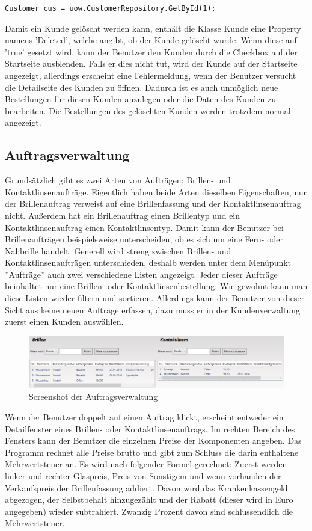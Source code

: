 \begin{lstlisting}
Customer cus = uow.CustomerRepository.GetById(1);
\end{lstlisting}
Damit ein Kunde gelöscht werden kann, enthält die Klasse Kunde eine Property namens 'Deleted', welche angibt, ob der Kunde gelöscht wurde. Wenn diese auf 'true' gesetzt wird, kann der Benutzer den Kunden durch die Checkbox auf der Startseite ausblenden. Falls er dies nicht tut, wird der Kunde auf der Startseite angezeigt, allerdings erscheint eine Fehlermeldung, wenn der Benutzer versucht die Detailseite des Kunden zu öffnen. Dadurch ist es auch unmöglich neue Bestellungen für diesen Kunden anzulegen oder die Daten des Kunden zu bearbeiten. Die Bestellungen des gelöschten Kunden werden trotzdem normal angezeigt.
\subsection{Auftragsverwaltung}
Grundsätzlich gibt es zwei Arten von Aufträgen: Brillen- und Kontaktlinsenaufträge. Eigentlich haben beide Arten dieselben Eigenschaften, nur der Brillenauftrag verweist auf eine Brillenfassung und der Kontaktlinsenauftrag nicht. Außerdem hat ein Brillenauftrag einen Brillentyp und ein Kontaktlinsenauftrag einen Kontaktlinsentyp. Damit kann der Benutzer bei Brillenaufträgen beispielsweise unterscheiden, ob es sich um eine Fern- oder Nahbrille handelt. Generell wird streng zwischen Brillen- und Kontaktlinsenaufträgen unterschieden, deshalb werden unter dem Menüpunkt ''Aufträge'' auch zwei verschiedene Listen angezeigt. Jeder dieser Aufträge beinhaltet nur eine Brillen- oder Kontaktlinsenbestellung. Wie gewohnt kann man diese Listen wieder filtern und sortieren. Allerdings kann der Benutzer von dieser Sicht aus keine neuen Aufträge erfassen, dazu muss er in der Kundenverwaltung zuerst einen Kunden auswählen. 
\begin{figure}[H]
\begin{center}
	\includegraphics[scale=.45]{images/Auftraege.png}
\end{center}
	\caption{Screenshot der Auftragsverwaltung}
	\label{fig:sample}
\end{figure}
\noindent Wenn der Benutzer doppelt auf einen Auftrag klickt, erscheint entweder ein Detailfenster eines Brillen- oder Kontaktlinsenauftrags. Im rechten Bereich des Fensters kann der Benutzer die einzelnen Preise der Komponenten angeben. Das Programm rechnet alle Preise  brutto und gibt zum Schluss die darin enthaltene Mehrwertsteuer an. Es wird nach folgender Formel gerechnet: \newline Zuerst werden linker und rechter Glaspreis, Preis von Sonstigem und wenn vorhanden der Verkaufspreis der Brillenfassung addiert. Davon wird das Krankenkassengeld abgezogen, der Selbstbehalt hinzugezählt und der Rabatt (dieser wird in Euro angegeben) wieder subtrahiert. Zwanzig Prozent davon sind schlussendlich die Mehrwertsteuer. \newline
